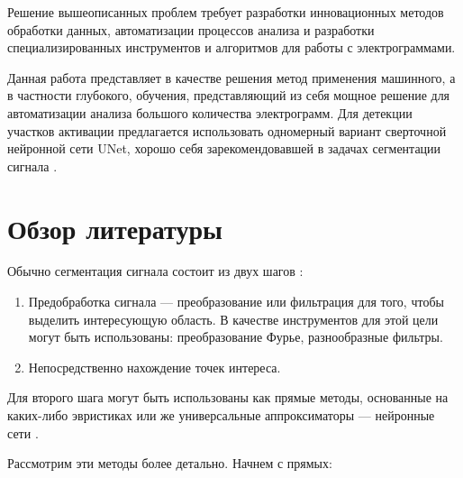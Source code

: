 Решение вышеописанных проблем требует разработки инновационных методов обработки данных,
автоматизации процессов анализа и разработки специализированных инструментов и
алгоритмов для работы с электрограммами.

Данная работа представляет в качестве решения метод применения машинного, а в
частности глубокого, обучения, представляющий из себя мощное решение для
автоматизации анализа большого количества электрограмм. Для детекции участков
активации предлагается использовать одномерный вариант сверточной нейронной
сети UNet, хорошо себя зарекомендовавшей в задачах сегментации сигнала \cite{victor}.

\section{Обзор литературы}
Обычно сегментация сигнала состоит из двух шагов \cite{ecg-segmentation}:

\begin{enumerate}
    \item Предобработка сигнала --- преобразование или фильтрация для того,
    чтобы выделить интересующую область. В качестве инструментов для этой цели
    могут быть использованы: преобразование Фурье, разнообразные фильтры.

    \item Непосредственно нахождение точек интереса.

\end{enumerate}

Для второго шага могут быть использованы как прямые методы, основанные на
каких-либо эвристиках \cite{euristic-1, euristic-2, euristic-3, euristic-4,
euristic-5} или же универсальные аппроксиматоры --- нейронные сети
\cite{victor}.

Рассмотрим эти методы более детально. Начнем с прямых:

\vspace*{\baselineskip}

